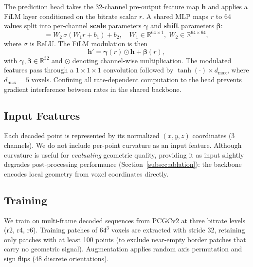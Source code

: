 \documentclass[conference]{IEEEtran}
\begin{document}
The prediction head takes the 32-channel pre-output feature map $\mathbf{h}$
and applies a FiLM layer conditioned on the bitrate scalar $r$.
A shared MLP maps $r$ to 64 values split into per-channel
\textbf{scale} parameters $\boldsymbol{\gamma}$ and
\textbf{shift} parameters $\boldsymbol{\beta}$:
\begin{equation}
  [\boldsymbol{\gamma};\boldsymbol{\beta}] = W_2\,\sigma(W_1 r + b_1) + b_2,
  \quad W_1\!\in\!\mathbb{R}^{64\times1},\; W_2\!\in\!\mathbb{R}^{64\times64},
  \label{eq:mlp}
\end{equation}
where $\sigma$ is ReLU. The FiLM modulation is then
\begin{equation}
  \mathbf{h}' = \boldsymbol{\gamma}(r) \odot \mathbf{h} + \boldsymbol{\beta}(r),
  \label{eq:film}
\end{equation}
with $\boldsymbol{\gamma},\boldsymbol{\beta}\in\mathbb{R}^{32}$ and $\odot$
denoting channel-wise multiplication.
The modulated features pass through a $1{\times}1{\times}1$ convolution
followed by $\tanh(\cdot) \times d_{\max}$, where $d_{\max}=5$ voxels.
Confining all rate-dependent computation to the head prevents gradient
interference between rates in the shared backbone.

\subsection{Input Features}

Each decoded point is represented by its normalized $(x, y, z)$ coordinates
(3 channels). We do not include per-point curvature as an input feature.
Although curvature is useful for \emph{evaluating} geometric quality,
providing it as input slightly degrades post-processing performance
(Section~\ref{subsec:ablation}): the backbone encodes local geometry
from voxel coordinates directly.

\subsection{Training}
\label{subsec:training}

We train on multi-frame decoded sequences from PCGCv2 at three bitrate levels
(r2, r4, r6). Training patches of $64^3$ voxels are extracted with stride 32,
retaining only patches with at least 100 points (to exclude near-empty border
patches that carry no geometric signal). Augmentation applies random
axis permutation and sign flips (48 discrete orientations).
\end{document}
